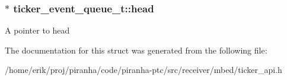 \subsubsection[{\texorpdfstring{head}{head}}]{$\ast$ ticker\+\_\+event\+\_\+queue\+\_\+t\+::head}\hypertarget{structticker__event__queue__t_a82f921674b4b3f8a5315f26200a9db11}{}\label{structticker__event__queue__t_a82f921674b4b3f8a5315f26200a9db11}
A pointer to head 

The documentation for this struct was generated from the following file\+:\begin{DoxyCompactItemize}
\item 
/home/erik/proj/piranha/code/piranha-\/ptc/src/receiver/mbed/ticker\+\_\+api.\+h\end{DoxyCompactItemize}
